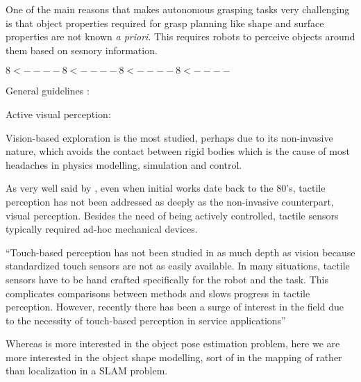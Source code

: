 
One of the main reasons that makes autonomous grasping tasks very challenging is that object properties required for grasp planning like shape and surface properties are not known \emph{a priori}. This requires robots to perceive objects around them based on sesnory information.

$ 8< ---- 8< ---- 8< ---- 8< ---- $








 

General guidelines : \citet{Bajcsy1989Machine}

Active visual perception: \citet{Bajcsy1988Active}

Vision-based exploration is the most studied, perhaps due to its non-invasive nature, which avoids the contact between rigid bodies which is the cause of most headaches in physics modelling, simulation and control.

As very well said by \citet{Petrovskaya2011Global}, even when initial works date back to the 80's, tactile perception has not been addressed as deeply as the non-invasive counterpart, visual perception. Besides the need of being actively controlled, tactile sensors typically required ad-hoc mechanical devices.

``Touch-based perception has not been studied in as much depth
as vision because standardized touch sensors are not as easily
available. In many situations, tactile sensors have to be hand
crafted specifically for the robot and the task. This complicates
comparisons between methods and slows progress in tactile
perception. However, recently there has been a surge of interest
in the field due to the necessity of touch-based perception in
service applications''

Whereas \citet{Petrovskaya2011Global} is more interested in the object pose estimation problem, here we are more interested in the object shape modelling, sort of in the mapping of rather than localization in a SLAM problem.

